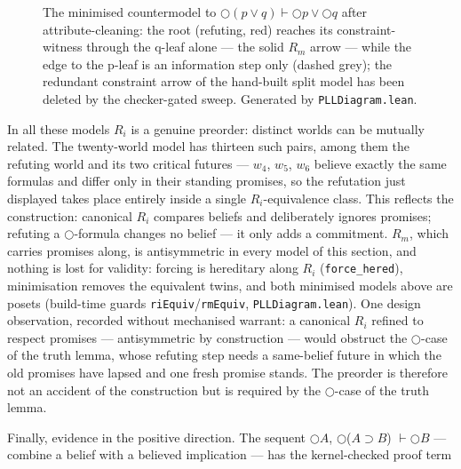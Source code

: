 \begin{figure}
\centering

\caption{The minimised countermodel to
\ensuremath{\bigcirc(p \vee q) \vdash \bigcirc p \vee \bigcirc q} after
attribute-cleaning: the root (refuting, red) reaches its
constraint-witness through the q-leaf alone --- the solid
\ensuremath{R_{m}} arrow --- while the edge to the p-leaf is an
information step only (dashed grey); the redundant constraint arrow of
the hand-built split model has been deleted by the checker-gated sweep.
Generated by \texttt{PLLDiagram.lean}.}
\label{fig:ordist}
\end{figure}

\begin{remark}\label{rem:preorder}
In all these models \ensuremath{R_{i}} is a genuine preorder: distinct worlds can be
mutually related. The twenty-world model has thirteen such pairs, among
them the refuting world and its two critical futures --- \ensuremath{w_{4}}, \ensuremath{w_{5}}, \ensuremath{w_{6}}
believe exactly the same formulas and differ only in their standing
promises, so the refutation just displayed takes place entirely
inside a single \ensuremath{R_{i}}-equivalence class. This reflects the
construction: canonical \ensuremath{R_{i}} compares beliefs and deliberately ignores
promises; refuting a \ensuremath{\bigcirc}-formula changes no belief --- it only adds
a commitment. \ensuremath{R_{m}}, which carries promises along, is antisymmetric in
every model of this section, and nothing is lost for validity: forcing
is hereditary along \ensuremath{R_{i}} (\texttt{force\_hered}), minimisation removes
the equivalent twins, and both minimised models above are posets
(build-time guards \texttt{riEquiv}/\texttt{rmEquiv},
\texttt{PLLDiagram.lean}). One design observation, recorded without
mechanised warrant: a canonical \ensuremath{R_{i}} refined to respect promises ---
antisymmetric by construction --- would obstruct the \ensuremath{\bigcirc}-case of the
truth lemma, whose refuting step needs a same-belief future in which
the old promises have lapsed and one fresh promise stands. The preorder
is therefore not an accident of the construction but is required by the
\ensuremath{\bigcirc}-case of the truth lemma.
\end{remark}

Finally, evidence in the positive direction. The sequent
\ensuremath{\bigcirc A}, \ensuremath{\bigcirc}(\ensuremath{A \supset B}) \ensuremath{\vdash \bigcirc B} --- combine a belief with a believed implication --- has
the kernel-checked proof term

